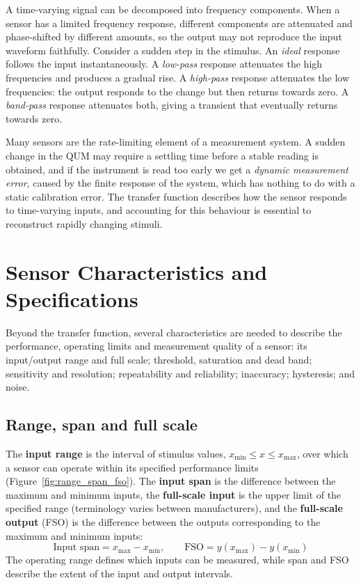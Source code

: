 \documentclass[letterpaper,11pt,leqno]{book}
\begin{document}
A time-varying signal can be decomposed into frequency components. When a sensor has a limited frequency response, different components are attenuated and phase-shifted by different amounts, so the output may not reproduce the input waveform faithfully. Consider a sudden step in the stimulus. An \emph{ideal} response follows the input instantaneously. A \emph{low-pass} response attenuates the high frequencies and produces a gradual rise. A \emph{high-pass} response attenuates the low frequencies: the output responds to the change but then returns towards zero. A \emph{band-pass} response attenuates both, giving a transient that eventually returns towards zero.

Many sensors are the rate-limiting element of a measurement system. A sudden change in the QUM may require a settling time before a stable reading is obtained, and if the instrument is read too early we get a \emph{dynamic measurement error}, caused by the finite response of the system, which has nothing to do with a static calibration error. The transfer function describes how the sensor responds to time-varying inputs, and accounting for this behaviour is essential to reconstruct rapidly changing stimuli.

\section{Sensor Characteristics and Specifications}
\label{sec:sensor_characteristics}

Beyond the transfer function, several characteristics are needed to describe the performance, operating limits and measurement quality of a sensor: its input/output range and full scale; threshold, saturation and dead band; sensitivity and resolution; repeatability and reliability; inaccuracy; hysteresis; and noise.

\subsection{Range, span and full scale}

The \textbf{input range} is the interval of stimulus values, $x_{\min} \le x \le x_{\max}$, over which a sensor can operate within its specified performance limits (Figure~\ref{fig:range_span_fso}). The \textbf{input span} is the difference between the maximum and minimum inputs, the \textbf{full-scale input} is the upper limit of the specified range (terminology varies between manufacturers), and the \textbf{full-scale output} (FSO) is the difference between the outputs corresponding to the maximum and minimum inputs:
\begin{equation}
\boxed{\text{Input span} = x_{\max} - x_{\min}, \qquad \text{FSO} = y(x_{\max}) - y(x_{\min})}
\label{eq:fso_def}
\end{equation}
The operating range defines which inputs can be measured, while span and FSO describe the extent of the input and output intervals.
\end{document}
